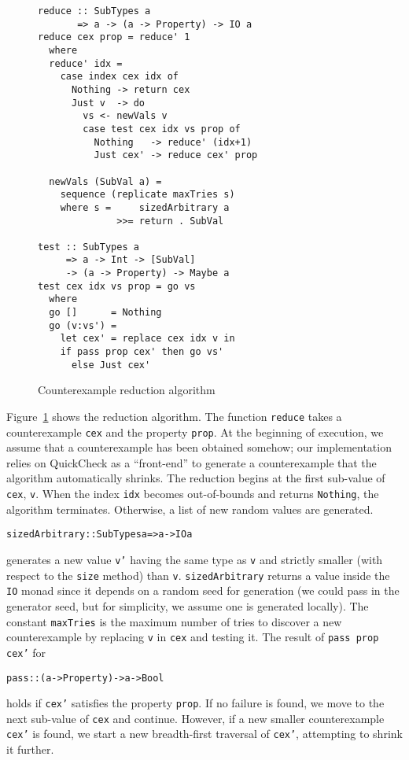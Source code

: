 \documentclass[10pt]{sigplanconf}
\newenvironment{code}{\begin{alltt}}{\end{alltt}}
\newcommand{\ttp}[1]{\texttt{#1}}
\begin{document}
\begin{figure}[ht]
  \begin{lstlisting}
reduce :: SubTypes a 
       => a -> (a -> Property) -> IO a
reduce cex prop = reduce' 1
  where
  reduce' idx = 
    case index cex idx of 
      Nothing -> return cex
      Just v  -> do
        vs <- newVals v
        case test cex idx vs prop of
          Nothing   -> reduce' (idx+1)
          Just cex' -> reduce cex' prop

  newVals (SubVal a) = 
    sequence (replicate maxTries s)
    where s =     sizedArbitrary a 
              >>= return . SubVal

test :: SubTypes a 
     => a -> Int -> [SubVal] 
     -> (a -> Property) -> Maybe a
test cex idx vs prop = go vs
  where
  go []      = Nothing
  go (v:vs') = 
    let cex' = replace cex idx v in
    if pass prop cex' then go vs' 
      else Just cex'
  \end{lstlisting}
  \caption{Counterexample reduction algorithm\label{fig:reduction}}
\end{figure}

Figure~\ref{fig:reduction} shows the reduction algorithm.  The function
\ttp{reduce} takes a counterexample \ttp{cex} and the property \ttp{prop}.  At
the beginning of execution, we assume that a counterexample has been obtained
somehow; our implementation relies on QuickCheck as a ``front-end'' to generate
a counterexample that the algorithm automatically shrinks.  The reduction begins
at the first sub-value of \ttp{cex}, \ttp{v}.  When the index \ttp{idx} becomes
out-of-bounds and returns \ttp{Nothing}, the algorithm terminates.  Otherwise, a
list of new random values are generated.
%
\begin{code}
sizedArbitrary :: SubTypes a => a -> IO a  
\end{code}
%
generates a new value \ttp{v'} having the same type as \ttp{v} and strictly
smaller (with respect to the \ttp{size} method) than \ttp{v}.
\ttp{sizedArbitrary} returns a value inside the \ttp{IO} monad since it depends
on a random seed for generation (we could pass in the generator seed, but for
simplicity, we assume one is generated locally).  The constant \ttp{maxTries} is
the maximum number of tries to discover a new counterexample by replacing
\ttp{v} in \ttp{cex} and testing it.  The result of \ttp{pass prop cex'} for
%
\begin{code}
pass :: (a -> Property) -> a -> Bool
\end{code}
%
holds if \ttp{cex'} satisfies the property \ttp{prop}.  If no failure is found,
we move to the next sub-value of \ttp{cex} and continue.  However, if a new
smaller counterexample \ttp{cex'} is found, we start a new breadth-first
traversal of \ttp{cex'}, attempting to shrink it further.
\end{document}
